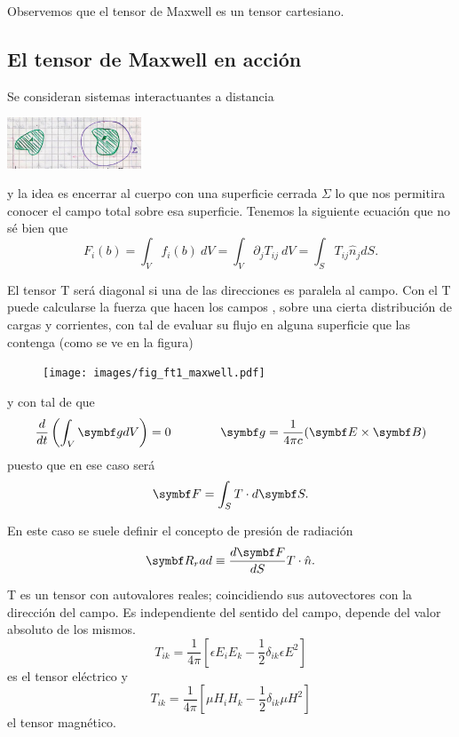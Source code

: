 \documentclass[10pt,oneside]{CBFT_book}
\begin{document}
Observemos que el tensor de Maxwell es un tensor cartesiano.



\subsection{El tensor de Maxwell en acción}

Se consideran sistemas interactuantes a distancia

\includegraphics[width=0.3\textwidth]{images/fig_ft1_PicsMaxwellA.jpg}

y la idea es encerrar al cuerpo con una superficie cerrada $\Sigma$ lo que nos permitira conocer
el campo total sobre esa superficie.
Tenemos la siguiente ecuación que no sé bien que
\[
	F_i(b) = \int_V f_i(b) \: dV = \int_V \partial_j T_{ij} \: dV = \int_S T_{ij} \hat{n}_j dS.
\]

El tensor T será diagonal si una de las direcciones es paralela al campo. Con el T puede calcularse
la fuerza que hacen los campos ,  sobre una cierta distribución de cargas y corrientes,
con tal de evaluar su flujo en alguna superficie que las contenga (como se ve en la figura)

\begin{figure}[htb]
	\begin{center}
	\texttt{[image: images/fig\_ft1\_maxwell.pdf]}	 
	\end{center}
	\caption{}
\end{figure} 


y con tal de que 
\[
	\dtot{}{t}\left(\int_V \vb{g} dV \right) = 0 \qquad \qquad \vb{g} =  \frac{1}{4\pi c}(\pv{E}{B})
\]
puesto que en ese caso será
\[
	\vb{F} = \int_S T \cdot d\vb{S}.
\]

En este caso se suele definir el concepto de presión de radiación
\[
	\vb{R}_rad \equiv \dtot{\vb{F}}{S} T\cdot\hat{n}.
\]

T es un tensor con autovalores reales; coincidiendo sus autovectores con la dirección del campo.
Es independiente del sentido del campo, depende del valor absoluto de los mismos.
\[
	T_{ik} = \frac{1}{4\pi} \left[ \epsilon E_iE_k - \frac{1}{2}\delta_{ik} \epsilon E^2 \right] 
\]
es el tensor eléctrico y
\[
	T_{ik} = \frac{1}{4\pi} \left[ \mu H_iH_k - \frac{1}{2}\delta_{ik} \mu H^2  \right] 
\]
el tensor magnético.
\end{document}
